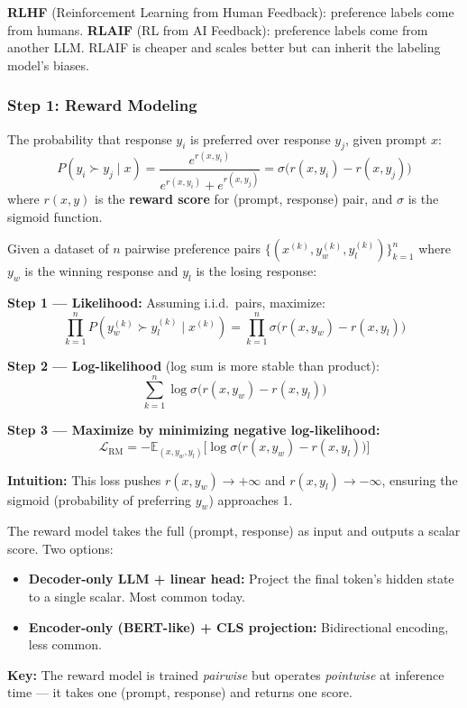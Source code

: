 \documentclass[11pt, a4paper]{article}
\begin{document}
\begin{notebox}
\textbf{RLHF} (Reinforcement Learning from Human Feedback): preference labels come from humans. \textbf{RLAIF} (RL from AI Feedback): preference labels come from another LLM. RLAIF is cheaper and scales better but can inherit the labeling model's biases.
\end{notebox}

\subsubsection{Step 1: Reward Modeling}

\begin{defbox}
The probability that response $y_i$ is preferred over response $y_j$, given prompt $x$:
\[
P(y_i \succ y_j \mid x) = \frac{e^{r(x, y_i)}}{e^{r(x, y_i)} + e^{r(x, y_j)}} = \sigma\!\big(r(x, y_i) - r(x, y_j)\big)
\]
where $r(x, y)$ is the \textbf{reward score} for (prompt, response) pair, and $\sigma$ is the sigmoid function.
\end{defbox}

\begin{mathbox}
Given a dataset of $n$ pairwise preference pairs $\{(x^{(k)}, y_w^{(k)}, y_l^{(k)})\}_{k=1}^n$ where $y_w$ is the winning response and $y_l$ is the losing response:

\textbf{Step 1 --- Likelihood:} Assuming i.i.d.\ pairs, maximize:
\[
\prod_{k=1}^n P(y_w^{(k)} \succ y_l^{(k)} \mid x^{(k)}) = \prod_{k=1}^n \sigma\!\big(r(x, y_w) - r(x, y_l)\big)
\]

\textbf{Step 2 --- Log-likelihood} (log sum is more stable than product):
\[
\sum_{k=1}^n \log \sigma\!\big(r(x, y_w) - r(x, y_l)\big)
\]

\textbf{Step 3 --- Maximize by minimizing negative log-likelihood:}
\[
\boxed{\mathcal{L}_{\text{RM}} = -\mathbb{E}_{(x,y_w,y_l)}\!\Big[\log \sigma\!\big(r(x, y_w) - r(x, y_l)\big)\Big]}
\]

\textbf{Intuition:} This loss pushes $r(x, y_w) \to +\infty$ and $r(x, y_l) \to -\infty$, ensuring the sigmoid (probability of preferring $y_w$) approaches 1.
\end{mathbox}

\begin{notebox}
The reward model takes the full (prompt, response) as input and outputs a scalar score. Two options:
\begin{itemize}[leftmargin=1.5em]
  \item \textbf{Decoder-only LLM + linear head:} Project the final token's hidden state to a single scalar. Most common today.
  \item \textbf{Encoder-only (BERT-like) + CLS projection:} Bidirectional encoding, less common.
\end{itemize}
\textbf{Key:} The reward model is trained \emph{pairwise} but operates \emph{pointwise} at inference time --- it takes one (prompt, response) and returns one score.
\end{notebox}
\end{document}

